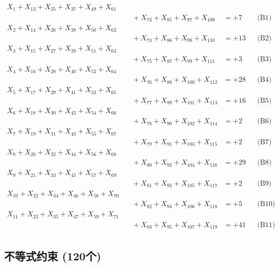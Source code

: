 \documentclass[a4paper,10pt]{article}
\begin{document}
{\begin{align}
X_{1} + X_{13} + X_{25} + X_{37} + X_{49} + X_{61} \\[0.1ex]
&\quad  + X_{73} + X_{85} + X_{97} + X_{109} &= +7 && \text{(B1)} \\
X_{2} + X_{14} + X_{26} + X_{38} + X_{50} + X_{62} \\[0.1ex]
&\quad  + X_{74} + X_{86} + X_{98} + X_{110} &= +13 && \text{(B2)} \\
X_{3} + X_{15} + X_{27} + X_{39} + X_{51} + X_{63} \\[0.1ex]
&\quad  + X_{75} + X_{87} + X_{99} + X_{111} &= +3 && \text{(B3)} \\
X_{4} + X_{16} + X_{28} + X_{40} + X_{52} + X_{64} \\[0.1ex]
&\quad  + X_{76} + X_{88} + X_{100} + X_{112} &= +28 && \text{(B4)} \\
\allowbreak
X_{5} + X_{17} + X_{29} + X_{41} + X_{53} + X_{65} \\[0.1ex]
&\quad  + X_{77} + X_{89} + X_{101} + X_{113} &= +16 && \text{(B5)} \\
X_{6} + X_{18} + X_{30} + X_{42} + X_{54} + X_{66} \\[0.1ex]
&\quad  + X_{78} + X_{90} + X_{102} + X_{114} &= +2 && \text{(B6)} \\
X_{7} + X_{19} + X_{31} + X_{43} + X_{55} + X_{67} \\[0.1ex]
&\quad  + X_{79} + X_{91} + X_{103} + X_{115} &= +2 && \text{(B7)} \\
X_{8} + X_{20} + X_{32} + X_{44} + X_{56} + X_{68} \\[0.1ex]
&\quad  + X_{80} + X_{92} + X_{104} + X_{116} &= +29 && \text{(B8)} \\
X_{9} + X_{21} + X_{33} + X_{45} + X_{57} + X_{69} \\[0.1ex]
&\quad  + X_{81} + X_{93} + X_{105} + X_{117} &= +2 && \text{(B9)} \\
\allowbreak
X_{10} + X_{22} + X_{34} + X_{46} + X_{58} + X_{70} \\[0.1ex]
&\quad  + X_{82} + X_{94} + X_{106} + X_{118} &= +5 && \text{(B10)} \\
X_{11} + X_{23} + X_{35} + X_{47} + X_{59} + X_{71} \\[0.1ex]
&\quad  + X_{83} + X_{95} + X_{107} + X_{119} &= +41 && \text{(B11)} \\
\end{align}
}

\subsection{不等式约束 (120个)}
\end{document}

